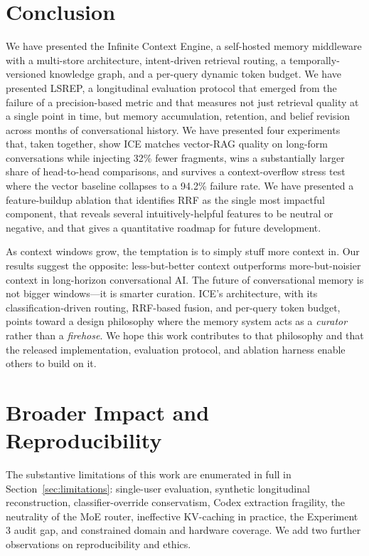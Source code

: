 \documentclass[11pt,a4paper]{article}
\begin{document}
\section{Conclusion}
\label{sec:conclusion}

We have presented the Infinite Context Engine, a self-hosted memory middleware with a multi-store architecture, intent-driven retrieval routing, a temporally-versioned knowledge graph, and a per-query dynamic token budget. We have presented LSREP, a longitudinal evaluation protocol that emerged from the failure of a precision-based metric and that measures not just retrieval quality at a single point in time, but memory accumulation, retention, and belief revision across months of conversational history. We have presented four experiments that, taken together, show ICE matches vector-RAG quality on long-form conversations while injecting 32\% fewer fragments, wins a substantially larger share of head-to-head comparisons, and survives a context-overflow stress test where the vector baseline collapses to a 94.2\% failure rate. We have presented a feature-buildup ablation that identifies RRF as the single most impactful component, that reveals several intuitively-helpful features to be neutral or negative, and that gives a quantitative roadmap for future development.

As context windows grow, the temptation is to simply stuff more context in. Our results suggest the opposite: less-but-better context outperforms more-but-noisier context in long-horizon conversational AI. The future of conversational memory is not bigger windows---it is smarter curation. ICE's architecture, with its classification-driven routing, RRF-based fusion, and per-query token budget, points toward a design philosophy where the memory system acts as a \emph{curator} rather than a \emph{firehose}. We hope this work contributes to that philosophy and that the released implementation, evaluation protocol, and ablation harness enable others to build on it.

\section*{Broader Impact and Reproducibility}

The substantive limitations of this work are enumerated in full in Section~\ref{sec:limitations}: single-user evaluation, synthetic longitudinal reconstruction, classifier-override conservatism, Codex extraction fragility, the neutrality of the MoE router, ineffective KV-caching in practice, the Experiment 3 audit gap, and constrained domain and hardware coverage. We add two further observations on reproducibility and ethics.
\end{document}
